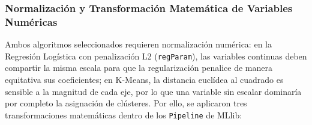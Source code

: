 \documentclass[11pt,a4paper]{article}
\begin{document}
\begin{table}[H]
\centering
\scriptsize
\renewcommand{\arraystretch}{1.2}
\caption{Matriz de correlación de Pearson en Spark MLlib para las variables de perfil territorial (K-Means).}
\label{tab:corr_km}
\end{table}

\subsubsection{Normalización y Transformación Matemática de Variables Numéricas}
\label{subsubsec:num4b_normalizacion}

Ambos algoritmos seleccionados requieren normalización numérica: en la Regresión Logística con penalización L2 (\texttt{regParam}), las variables continuas deben compartir la misma escala para que la regularización penalice de manera equitativa sus coeficientes; en K-Means, la distancia euclídea al cuadrado es sensible a la magnitud de cada eje, por lo que una variable sin escalar dominaría por completo la asignación de clústeres. Por ello, se aplicaron tres transformaciones matemáticas dentro de los \texttt{Pipeline} de MLlib:
\end{document}
